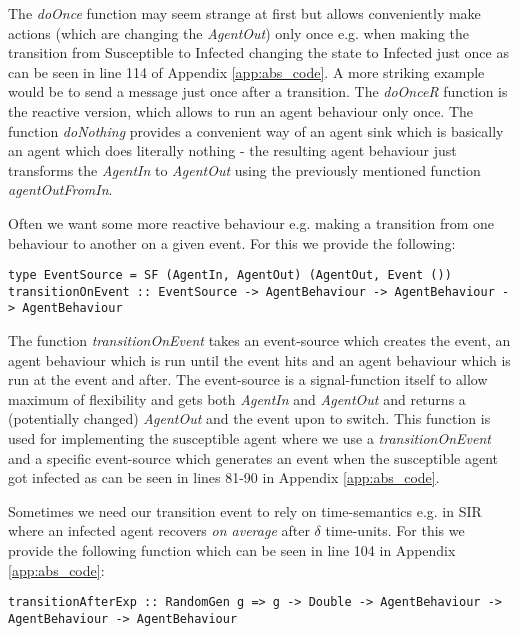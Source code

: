 The \textit{doOnce} function may seem strange at first but allows conveniently make actions (which are changing the \textit{AgentOut}) only once e.g. when making the transition from Susceptible to Infected changing the state to Infected just once as can be seen in line 114 of Appendix \ref{app:abs_code}. A more striking example would be to send a message just once after a transition. The \textit{doOnceR} function is the reactive version, which allows to run an agent behaviour only once. The function \textit{doNothing} provides a convenient way of an agent sink which is basically an agent which does literally nothing - the resulting agent behaviour just transforms the \textit{AgentIn} to \textit{AgentOut} using the previously mentioned function \textit{agentOutFromIn}.

Often we want some more reactive behaviour e.g. making a transition from one behaviour to another on a given event. For this we provide the following:

\begin{verbatim}
type EventSource = SF (AgentIn, AgentOut) (AgentOut, Event ())
transitionOnEvent :: EventSource -> AgentBehaviour -> AgentBehaviour -> AgentBehaviour
\end{verbatim}

The function \textit{transitionOnEvent} takes an event-source which creates the event, an agent behaviour which is run until the event hits and an agent behaviour which is run at the event and after. The event-source is a signal-function itself to allow maximum of flexibility and gets both \textit{AgentIn} and \textit{AgentOut} and returns a (potentially changed) \textit{AgentOut} and the event upon to switch. 
This function is used for implementing the susceptible agent where we use a \textit{transitionOnEvent} and a specific event-source which generates an event when the susceptible agent got infected as can be seen in lines 81-90 in Appendix \ref{app:abs_code}.

Sometimes we need our transition event to rely on time-semantics e.g. in SIR where an infected agent recovers \textit{on average} after $\delta$ time-units. For this we provide the following function which can be seen in line 104 in Appendix \ref{app:abs_code}:

\begin{verbatim}
transitionAfterExp :: RandomGen g => g -> Double -> AgentBehaviour -> AgentBehaviour -> AgentBehaviour
\end{verbatim}

